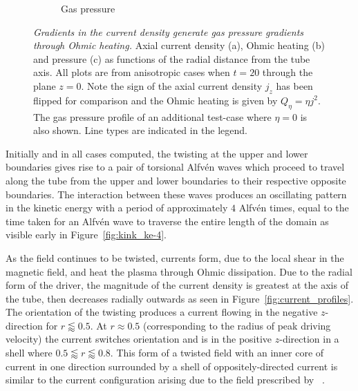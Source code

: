 \documentclass[fleqn,usenatbib]{mnras}
\newcommand{\rev}[1]{{\color{red} {#1}}}
\newcommand{\revcite}[1]{{\color{red} \underline{#1}}}
\newcommand{\mycaption}[2]{\caption[#1]{\emph{#1} #2}}
\begin{document}
\begin{figure}
\begin{subfigure}{0.32\textwidth}
      \caption{\rev{Gas pressure}}
      \label{fig:pressure_profiles}
    \end{subfigure}
  \mycaption{Gradients in the current density generate \rev{gas} pressure gradients
  through Ohmic heating.}{Axial current density (a), Ohmic heating (b) and
  pressure (c) as functions of the radial distance from the tube axis. All
  plots are from anisotropic cases when $t=20$ through the plane $z=0$. Note
  the sign of the axial current density $j_z$ has been flipped for comparison
  and the Ohmic heating is given by $Q_{\eta} = \eta j^2$. The
  \rev{gas} pressure profile of an additional test-case where $\eta=0$
  is also shown. Line types are   indicated in the legend.}
  \label{fig:pressure_and_heating}
\end{figure}

Initially and in all cases computed, the twisting at the upper and lower
boundaries gives rise to a pair of torsional Alfv\'en waves which proceed to
travel along the tube from the upper and lower boundaries to their respective
opposite boundaries. The interaction between these waves produces an
oscillating pattern in the kinetic energy with a period of approximately $4$
Alfv\'en times, equal to the time taken for an Alfv\'en wave to traverse the
entire length of the domain as visible early in Figure~\ref{fig:kink_ke-4}. 

As the field continues to be twisted, currents form, due to the local shear in
the magnetic field, and heat the plasma through Ohmic dissipation. Due to the
radial form of the driver, the magnitude of the current density is greatest at
the axis of the tube, then decreases radially outwards as seen in
Figure~\ref{fig:current_profiles}. The orientation of the twisting produces
a current flowing in the negative $z$-direction for $r\lessapprox0.5$. At $r
\approx 0.5$ (corresponding to the radius of peak driving velocity) the current
switches orientation and is in the positive $z$-direction in a shell where
$0.5\lessapprox r \lessapprox 0.8$. This form of a twisted field with an inner
core of current in one direction surrounded by a shell of oppositely-directed
current is similar to the current configuration arising due to the field
prescribed by~\revcite{\citet{quinnEffectAnisotropicViscosity2020}}. 
\end{document}

